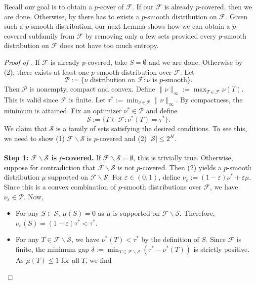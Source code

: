 \documentclass{article}
\renewcommand{\epsilon}{\varepsilon}
\newcommand{\<}{\langle}
\renewcommand{\>}{\rangle}
\newcommand{\calF}{\mathcal{F}}
\newcommand{\calP}{\mathcal{P}}
\newcommand{\calS}{\mathcal{S}}
\begin{document}
Recall our goal is to obtain a $p$-cover of $\calF$. If our $\calF$ is already $p$-covered, then we are done. Otherwise, by  there has to exists a $p$-smooth distribution on $\calF$. Given such a $p$-smooth distribution, our next Lemma shows how we can obtain a $p$-covered subfamily from $ \calF$ by removing only a few sets provided every $p$-smooth distribution on $\calF$ does not have too much entropy. 



\begin{proof}[Proof of  ]
    If $\calF$ is already $p$-covered, take $S = \emptyset$ and we are done. Otherwise by  (2), there exists at least one $p$-smooth distribution over $\calF$. Let 
    \[
    \calP := \{\nu \text{ distribution on }\calF: \nu \text{ is }p \text{-smooth}\}.
    \]
    Then $\calP$ is nonempty, compact and convex. Define $\| \nu \|_{\infty}:= \max_{T \in \calF} \nu (T)$. This is valid since $\calF$ is finite. Let $\tau^* := \min_{\nu \in \calP} \| \nu \|_{\infty}$. By compactness, the minimum is attained. Fix an optimizer $\nu^* \in \calP$
    and define
    \[
    \calS := \{T \in \calF: \nu^* (T) = \tau^*\}.
    \]
    We claim that $\calS$ is a family of sets satisfying the desired conditions. To see this, we need to show (1) $\calF \backslash \calS$ is $p$-covered and (2) $|\calS| \leq 2^H$. \\
    \\
    \textbf{Step 1: $\calF \backslash \calS$ is $p$-covered.} If $\calF \backslash \calS = \emptyset$, this is trivially true. Otherwise, suppose for contradiction that $\calF \backslash \calS$ is not $p$-covered. Then (2) yields a $p$-smooth distribution $\mu$ supported on $\calF \backslash \calS$. For $\epsilon \in (0, 1)$, define $\nu_{\epsilon}:= (1-\epsilon)\nu^* + \epsilon \mu$. Since this is a convex combination of $p$-smooth distributions over $\calF$, we have $\nu_{\epsilon} \in \calP$. Now,
    \begin{itemize}
        \item For any $S \in \calS$, $\mu (S) = 0$ as $\mu$ is supported on $\calF \backslash \calS$. Therefore, $\nu_{\epsilon}(S) = (1-\epsilon)\tau^* < \tau^*$.
        \item For any $T \in \calF \backslash \calS$, we have $\nu^* (T) < \tau^*$ by the definition of $S$. Since $\calF$ is finite, the minimum gap $\delta:= \min_{T \in \calF \backslash \calS} (\tau^* - \nu^* (T))$ is strictly positive. As $\mu (T) \leq 1$ for all $T$, we find

\end{itemize}
\end{proof}
\end{document}
